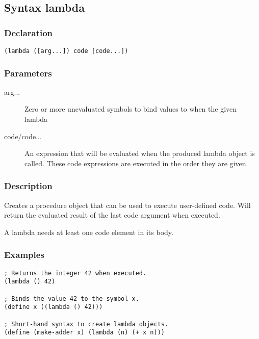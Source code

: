 \subsection{Syntax lambda}
\label{builtins/lambda}

\subsubsection*{Declaration}
\begin{lstlisting}
(lambda ([arg...]) code [code...])
\end{lstlisting}

\subsubsection*{Parameters}
\begin{description}
	\item[arg...] Zero or more unevaluated symbols to bind values to when the given lambda
	\item[code/code...] An expression that will be evaluated when the produced lambda object is called. These code expressions are executed in the order they are given.
\end{description}

\subsubsection*{Description}
Creates a procedure object that can be used to execute user-defined code. Will return the evaluated result of the last code argument when executed.

A lambda needs at least one code element in its body.

\subsubsection*{Examples}
\begin{lstlisting}
; Returns the integer 42 when executed.
(lambda () 42)

; Binds the value 42 to the symbol x.
(define x ((lambda () 42)))

; Short-hand syntax to create lambda objects.
(define (make-adder x) (lambda (n) (+ x n)))
\end{lstlisting}
